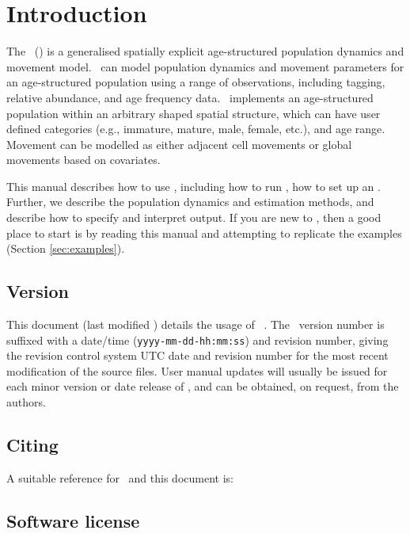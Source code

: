 \section{Introduction\label{sec:Introduction}}

The \SPMName\ (\SPM) is a generalised spatially explicit age-structured population dynamics and movement model. \SPM\ can model population dynamics and movement parameters for an age-structured population using a range of observations, including tagging, relative abundance, and age frequency data. \SPM\ implements an age-structured population within an arbitrary shaped spatial structure, which can have user defined categories (e.g., immature, mature, male, female, etc.), and age range. Movement can be modelled as either adjacent cell movements or global movements based on covariates.

This manual describes how to use \SPM, including how to run \SPM, how to set up an \config. Further, we describe the population dynamics and estimation methods, and describe how to specify and interpret output. If you are new to \SPM, then a good place to start is by reading this manual and attempting to replicate the examples (Section \ref{sec:examples}).

\subsection{Version\label{sec:version}}

This document (last modified \DocVer) details the usage of \SPM\ \VER. The \SPM\ version number is suffixed with a date/time (\texttt{yyyy-mm-dd-hh:mm:ss}) and revision number, giving the revision control system UTC date and revision number for the most recent modification of the source files. User manual updates will usually be issued for each minor version or date release of \SPM, and can be obtained, on request, from the authors.

\subsection{Citing \SPM}

A suitable reference for \SPM\ and this document is:

\ManualRef{}

\subsection{Software license}


